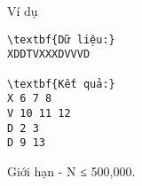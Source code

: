 Ví dụ
\begin{verbatim}
\textbf{Dữ liệu:}
XDDTVXXXDVVVD

\textbf{Kết quả:}
X 6 7 8
V 10 11 12
D 2 3
D 9 13
\end{verbatim}
Giới hạn
- N ≤ 500,000.